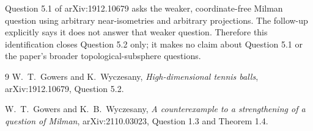 \documentclass[11pt]{article}
\begin{document}
Question 5.1 of arXiv:1912.10679 asks the weaker, coordinate-free Milman
question using arbitrary near-isometries and arbitrary projections.  The
follow-up explicitly says it does not answer that weaker question.  Therefore
this identification closes Question 5.2 only; it makes no claim about
Question 5.1 or the paper's broader topological-subsphere questions.

\begin{thebibliography}{9}
W.~T.~Gowers and K.~Wyczesany,
\emph{High-dimensional tennis balls}, arXiv:1912.10679, Question 5.2.

W.~T.~Gowers and K.~B.~Wyczesany,
\emph{A counterexample to a strengthening of a question of Milman},
arXiv:2110.03023, Question 1.3 and Theorem 1.4.
\end{thebibliography}
\end{document}
